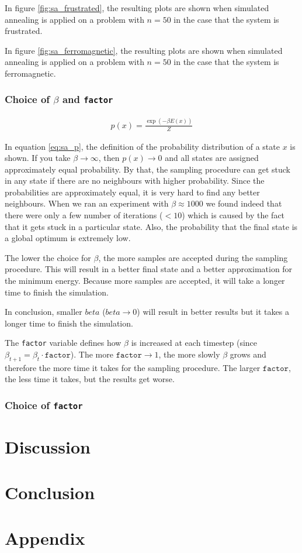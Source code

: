 \documentclass[10pt,a4paper]{article}
\begin{document}
In figure \ref{fig:sa_frustrated}, the resulting plots are shown when simulated annealing is applied on a problem with $n=50$ in the case that the system is frustrated.

In figure \ref{fig:sa_ferromagnetic}, the resulting plots are shown when simulated annealing is applied on a problem with $n=50$ in the case that the system is ferromagnetic.

\subsubsection{Choice of $\beta$ and \texttt{factor}}

\begin{align}
p(x) = \frac{\exp(-\beta E(x))}{Z}
\label{eq:sa_p}
\end{align}

In equation \ref{eq:sa_p}, the definition of the probability distribution of a state $x$ is shown. If you take $\beta \rightarrow \infty$, then $p(x) \rightarrow 0$ and all states are assigned approximately equal probability. By that, the sampling procedure can get stuck in any state if there are no neighbours with higher probability. Since the probabilities are approximately equal, it is very hard to find any better neighbours. When we ran an experiment with $\beta \approx 1000$ we found indeed that there were only a few number of iterations ($< 10$) which is caused by the fact that it gets stuck in a particular state. Also, the probability that the final state is a global optimum is extremely low.

The lower the choice for $\beta$, the more samples are accepted during the sampling procedure. This will result in a better final state and a better approximation for the minimum energy. Because more samples are accepted, it will take a longer time to finish the simulation.

In conclusion, smaller $beta$ ($beta \rightarrow 0$) will result in better results but it takes a longer time to finish the simulation.

The \texttt{factor} variable defines how $\beta$ is increased at each timestep (since $\beta_{t + 1} = \beta_t \cdot \texttt{factor}$). The more $\texttt{factor} \rightarrow 1$, the more slowly $\beta$ grows and therefore the more time it takes for the sampling procedure. The larger $\texttt{factor}$, the less time it takes, but the results get worse.

\subsubsection{Choice of \texttt{factor}}

\section{Discussion}

\section{Conclusion}

\newpage
\section{Appendix}
\end{document}
